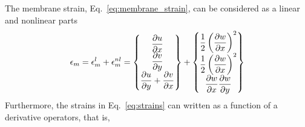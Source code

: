\documentclass[12pt]{article}
\numberwithin{equation}{section}
\newcommand{\dpdiff}[2]{ \dfrac{\partial #1}{ \partial #2} }
\begin{document}
The membrane strain, Eq.~\eqref{eq:membrane_strain}, can be considered as a linear and nonlinear parts
%
\begin{equation}
    {\renewcommand\arraystretch{1.65}
        \epsilon_m = \epsilon_m^l + \epsilon_m^{nl} =
        \begin{Bmatrix}
            \dpdiff{u}{x}                 \\
            \dpdiff{v}{y}                 \\
            \dpdiff{u}{y} + \dpdiff{v}{x} \\
        \end{Bmatrix}} +
    \begin{Bmatrix}
        \dfrac{1}{2} \left( \dpdiff{w}{x}\right)^2 \\
        \dfrac{1}{2} \left(\dpdiff{w}{x}\right)^2  \\
        \dpdiff{w}{x} \dpdiff{w}{y}                \\
    \end{Bmatrix}
\end{equation}
%
Furthermore, the strains in Eq.~\eqref{eq:strains} can written as a function of a derivative operators, that is,
%
\end{document}
